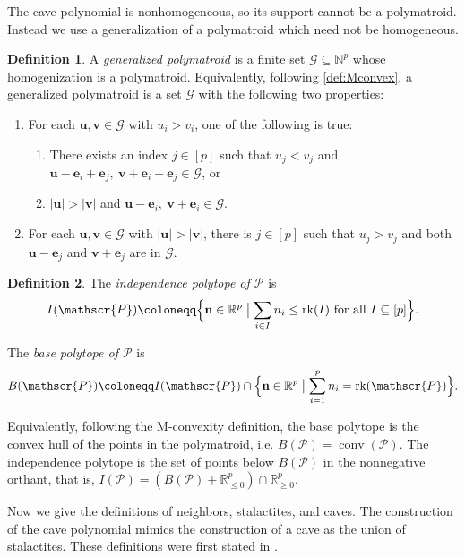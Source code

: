 \documentclass[a4paper, 11pt]{amsart}
\theoremstyle{definition}
\newtheorem{definition}[definition]{Definition}
\newcommand{\bfu}{\mathbf{u}}
\newcommand{\bfv}{\mathbf{v}}
\newcommand{\bfn}{\mathbf{n}}
\newcommand{\bfe}{\mathbf{e}}
\newcommand{\sP}{\mathscr{P}}
\newcommand{\sG}{\mathscr{G}}
\newcommand{\N}{\mathbb{N}}
\newcommand{\R}{\mathbb{R}}
\DeclareMathOperator{\rk}{rk}
\DeclareMathOperator{\conv}{conv}
\begin{document}
The cave polynomial is nonhomogeneous, so its support cannot be a polymatroid. Instead we use a generalization of a polymatroid which need not be homogeneous. 

\begin{definition}
    A \textit{generalized polymatroid} is a finite set $\mathscr{G} \subseteq \N^p$ whose homogenization is a polymatroid. Equivalently, following \autoref{def:Mconvex}, a generalized polymatroid is a set $\sG$ with the following two properties:
    \begin{enumerate}
        \item For each $\bfu, \bfv \in \sG$ with $u_i > v_i$, one of the following is true:
        \begin{enumerate}
            \item There exists an index $j \in [p]$ such that $u_j<v_j$ and $\bfu-\bfe_i+\bfe_j, \ \bfv+\bfe_i-\bfe_j \in \mathscr{G}$, or
            \item $|\bfu| > |\bfv|$ and $\bfu-\bfe_i, \ \bfv+\bfe_i \in \mathscr{G}$. 
        \end{enumerate}
        \item For each $\bfu, \bfv \in \mathscr{G}$ with $|\bfu|>|\bfv|$, there is $j \in [p]$ such that $u_j >v_j$ and both $\bfu-\bfe_j$ and $\bfv+\bfe_j$ are in $\mathscr{G}$. 
    \end{enumerate}
\end{definition}

\begin{definition}
    The \textit{independence polytope of $\sP$} is
$$I(\sP) \coloneqq \Big\{\bfn \in \R^p \bigm| \sum_{i\in I} n_i \le \rk(I) \text{ for all }I \subseteq [p]\Big\}.$$

The \textit{base polytope of $\sP$} is 
$$B(\sP) \coloneqq I(\sP) \cap \Big\{\bfn \in \R^p \bigm| \sum_{i=1}^pn_i = \rk(\sP)\Big\}.$$

    Equivalently, following the M-convexity definition, the base polytope is the convex hull of the points in the polymatroid, i.e. $B(\sP) = \conv(\sP)$. The independence polytope is the set of points below $B(\sP)$ in the nonnegative orthant, that is, $I(\sP) = (B(\sP) + \R^p_{\le0})\cap \R_{\ge0}^p$.
\end{definition}

Now we give the definitions of neighbors, stalactites, and caves. The construction of the cave polynomial mimics the construction of a cave as the union of stalactites. These definitions were first stated in \cite[Section 5]{CCRMM}. 
\end{document}
